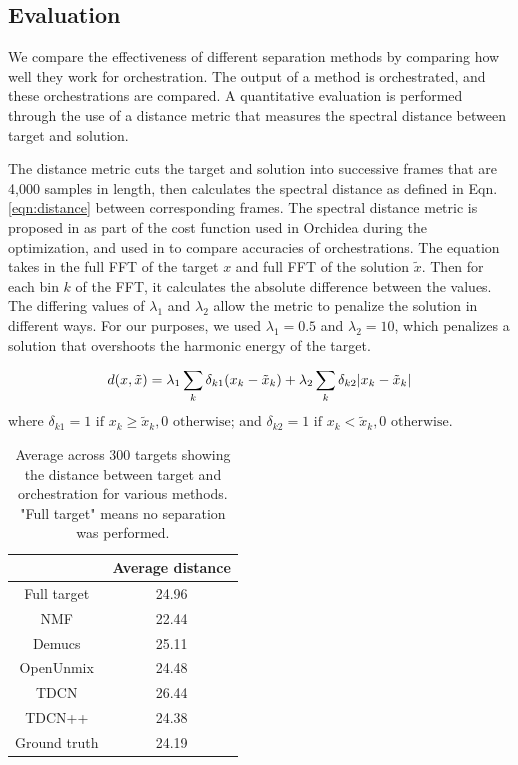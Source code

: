 \documentclass{article}
\begin{document}
		\subsection{Evaluation}
		We compare the effectiveness of different separation methods by comparing how well they work for orchestration. The output of a method is orchestrated, and these orchestrations are compared. A quantitative evaluation is performed through the use of a distance metric that measures the spectral distance between target and solution. 
		
		The distance metric cuts the target and solution into successive frames that are 4,000 samples in length, then calculates the spectral distance as defined in Eqn. \ref{eqn:distance} between corresponding frames. The spectral distance metric is proposed in \cite{Cella2020} as part of the cost function used in Orchidea during the optimization, and used in \cite{Cella2020b} to compare accuracies of orchestrations. The equation takes in the full FFT of the target $x$ and full FFT of the solution $\tilde{x}$. Then for each bin $k$ of the FFT, it calculates the absolute difference between the values. The differing values of $\lambda_1$ and $\lambda_2$ allow the metric to penalize the solution in different ways. For our purposes, we used $\lambda_1 = 0.5$ and $\lambda_2 = 10$, which penalizes a solution that overshoots the harmonic energy of the target.
		
		\begin{equation}\label{eqn:distance}
d(x, \tilde{x}) =\lambda_1 \sum_k \delta_{k1}(x_k - \tilde{x}_k) + \lambda_2 \sum_k \delta_{k2}|x_k - \tilde{x	}_k| \\
\end{equation}
where $\delta_{k1} = 1 \text{  if  } x_k \ge \tilde{x}_k, 0 \text{  otherwise}$; and $\delta_{k2} = 1 \text{  if  } x_k < \tilde{x}_k, 0 \text{  otherwise}$.
	
	
	\begin{table}[t]
		\begin{center}
			\begin{tabular}{|c|c|}
				\hline
				& Average distance \\
				\hline
				Full target & 24.96 \\
				\hline
				NMF & 22.44 \\
				\hline
				Demucs & 25.11 \\
				\hline
				OpenUnmix & 24.48\\
				\hline
				TDCN & 26.44\\
				\hline
				TDCN++ & 24.38 \\
				\hline
				Ground truth & 24.19 \\
				\hline
			\end{tabular}
		\end{center}
		\caption{Average across 300 targets showing the distance between target and orchestration for various methods. "Full target" means no separation was performed.}
		\label{tab:distances}
	\end{table}
		
\end{document}

